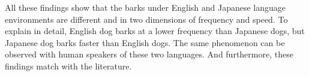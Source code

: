 All these findings show that the barks under English and Japanese language environments are different and in two dimensions of frequency and speed. To explain in detail, English dog barks at a lower frequency than Japanese dogs, but Japanese dog barks faster than English dogs. The same phenomenon can be observed with human speakers of these two languages. And furthermore, these findings match with the literature.








